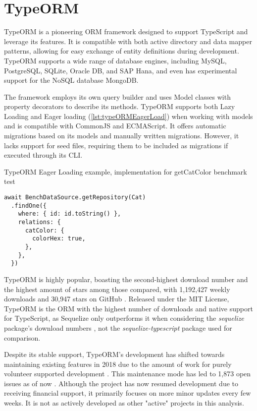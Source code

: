 \section{TypeORM}

TypeORM is a pioneering ORM framework designed to support TypeScript and
leverage its features. It is compatible with both active directory and data
mapper patterns, allowing for easy exchange of entity definitions during
development. TypeORM supports a wide range of database engines, including MySQL,
PostgreSQL, SQLite, Oracle DB, and SAP Hana, and even has experimental support
for the NoSQL database MongoDB.

The framework employs its own query builder and uses Model classes with property
decorators to describe its methods. TypeORM supports both Lazy Loading and Eager
loading (\autoref{lst:typeORMEagerLoad}) when working with models and is compatible
with CommonJS and ECMAScript. It offers automatic migrations based on its models
and manually written migrations. However, it lacks support for seed files,
requiring them to be included as migrations if executed through its CLI.

\begin{listing}[h]
  \caption{TypeORM Eager Loading example, implementation for getCatColor benchmark test}
  \label{lst:typeORMEagerLoad}
  \begin{verbatim}
await BenchDataSource.getRepository(Cat)
  .findOne({
    where: { id: id.toString() },
    relations: {
      catColor: {
        colorHex: true,
      },
    },
  })
  \end{verbatim}
\end{listing}

TypeORM is highly popular, boasting the second-highest download number and the
highest amount of stars among those compared, with 1,192,427 weekly downloads
\cite{typeORMNpm} and 30,947 stars on GitHub \cite{typeORMGitHub}. Released
under the MIT License, TypeORM is the ORM with the highest number of downloads
and native support for TypeScript, as Sequelize only outperforms it when
considering the \textit{sequelize} package's download numbers
\cite{sequelizeNpm}, not the \textit{sequelize-typescript} package
\cite{sequelizeTypescriptNpm} used for comparison.

Despite its stable support, TypeORM's development has shifted towards
maintaining existing features in 2018 due to the amount of work for purely
volunteer supported development \cite{typeORMGitHubFuture}. This maintenance
mode has led to 1,873 open issues as of now \cite{typeORMGitHub}. Although the
project has now resumed development due to receiving financial support, it
primarily focuses on more minor updates every few weeks. It is not as actively
developed as other "active" projects in this analysis.

